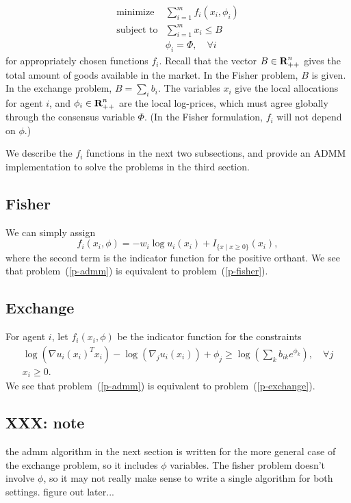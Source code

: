 \documentclass[12pt]{article}
\begin{document}
\begin{equation}
\label{p-admm}
\begin{array}{ll}
\mbox{minimize} & \sum_{i=1}^m f_i(x_i, \phi_i) \\
\mbox{subject to} & \sum_{i=1}^m x_i \leq B\\
& \phi_i = \Phi, \quad \forall i
\end{array}
\end{equation}
for appropriately chosen functions $f_i$.
Recall that the vector $B \in {\mbox{\bf R}}^n_{++}$ gives the total
amount of goods available in the market. In the Fisher problem,
$B$ is given.
In the exchange problem, $B = \sum_i b_i$.
The variables $x_i$ give the local allocations for agent $i$, and
$\phi_i \in {\mbox{\bf R}}^n_{++}$
are the local log-prices, which must agree globally through the
consensus variable $\Phi$.
(In the Fisher formulation, $f_i$ will not depend on $\phi$.)

We describe the $f_i$ functions in the next two subsections, and provide an
ADMM implementation to solve the problems in the third section.

\subsection{Fisher}
We can simply assign
\[
f_i(x_i, \phi) = -w_i \log u_i(x_i) + I_{\lbrace x \mid x \geq 0 \rbrace}(x_i),
\]
where the second term is the indicator function for the positive orthant.
We see that problem~(\ref{p-admm}) is equivalent to
problem~(\ref{p-fisher}).

\subsection{Exchange}

For agent $i$, let $f_i(x_i, \phi)$ be the indicator function for the
constraints
\[
\begin{array}{c}
\log(\nabla u_i(x_i)^T x_i) - \log(\nabla_j u_i(x_i)) + \phi_j \geq  \log\left(\sum_k b_{ik} e^{\phi_{k}}\right),\quad \forall j\\
x_i \geq 0.
\end{array}
\]
We see that problem~(\ref{p-admm}) is equivalent to problem~(\ref{p-exchange}).

\subsection{XXX: note}
the admm algorithm in the next section is written for the more general case of 
the exchange problem, so it includes $\phi$ variables.
The fisher problem doesn't involve $\phi$, so it may not really make sense
to write a single algorithm for both settings. figure out later...
\end{document}
